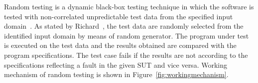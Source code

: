 Random testing is a dynamic black-box testing technique in which the software is tested with non-correlated unpredictable test data from the specified input domain~\cite{chan2003normalized}. As stated by Richard~\cite{hamlet1994random}, the test data are randomly selected from the identified input domain by means of random generator. The program under test is executed on the test data and the results obtained are compared with the program specifications. The test case fails if the results are not according to the specifications reflecting a fault in the given SUT and vice versa. Working mechanism of random testing is shown in Figure~\ref{fig:workingmechanism}.

\bigskip

